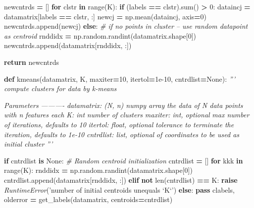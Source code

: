 \documentclass[]{book}
\newenvironment{Shaded}{\begin{snugshade}}{\end{snugshade}}
\newcommand{\BuiltInTok}[1]{#1}
\newcommand{\CommentTok}[1]{\textcolor[rgb]{0.56,0.35,0.01}{\textit{#1}}}
\newcommand{\ControlFlowTok}[1]{\textcolor[rgb]{0.13,0.29,0.53}{\textbf{#1}}}
\newcommand{\DecValTok}[1]{\textcolor[rgb]{0.00,0.00,0.81}{#1}}
\newcommand{\FloatTok}[1]{\textcolor[rgb]{0.00,0.00,0.81}{#1}}
\newcommand{\KeywordTok}[1]{\textcolor[rgb]{0.13,0.29,0.53}{\textbf{#1}}}
\newcommand{\NormalTok}[1]{#1}
\newcommand{\OperatorTok}[1]{\textcolor[rgb]{0.81,0.36,0.00}{\textbf{#1}}}
\newcommand{\PreprocessorTok}[1]{\textcolor[rgb]{0.56,0.35,0.01}{\textit{#1}}}
\newcommand{\StringTok}[1]{\textcolor[rgb]{0.31,0.60,0.02}{#1}}
\newcommand{\VariableTok}[1]{\textcolor[rgb]{0.00,0.00,0.00}{#1}}
\theoremstyle{definition}
\theoremstyle{definition}
\theoremstyle{definition}
\theoremstyle{definition}
\theoremstyle{remark}
\begin{document}
\begin{Shaded}
\begin{Highlighting}[]
\NormalTok{    newcntrds }\OperatorTok{=}\NormalTok{ []}
    \ControlFlowTok{for}\NormalTok{ clstr }\KeywordTok{in} \BuiltInTok{range}\NormalTok{(K):}
        \ControlFlowTok{if}\NormalTok{ (labels }\OperatorTok{==}\NormalTok{ clstr).}\BuiltInTok{sum}\NormalTok{() }\OperatorTok{>} \DecValTok{0}\NormalTok{:}
\NormalTok{            dataincj }\OperatorTok{=}\NormalTok{ datamatrix[labels }\OperatorTok{==}\NormalTok{ clstr, :]}
\NormalTok{            newcj }\OperatorTok{=}\NormalTok{ np.mean(dataincj, axis}\OperatorTok{=}\DecValTok{0}\NormalTok{)}
\NormalTok{            newcntrds.append(newcj)}
        \ControlFlowTok{else}\NormalTok{:}
            \CommentTok{# if no points in cluster -- use random datapoint as centroid}
\NormalTok{            rnddidx }\OperatorTok{=}\NormalTok{ np.random.randint(datamatrix.shape[}\DecValTok{0}\NormalTok{])}
\NormalTok{            newcntrds.append(datamatrix[rnddidx, :])}

    \ControlFlowTok{return}\NormalTok{ newcntrds}


\KeywordTok{def}\NormalTok{ kmeans(datamatrix, K, maxiter}\OperatorTok{=}\DecValTok{10}\NormalTok{, itertol}\OperatorTok{=}\FloatTok{1e-10}\NormalTok{, cntrdlist}\OperatorTok{=}\VariableTok{None}\NormalTok{):}
    \CommentTok{''' compute clusters for data by k-means}

\CommentTok{    Parameters}
\CommentTok{    ----------}
\CommentTok{    datamatrix: (N, n) numpy array}
\CommentTok{        the data of N data points with n features each}
\CommentTok{    K: int}
\CommentTok{        number of clusters}
\CommentTok{    maxiter: int, optional}
\CommentTok{        max number of iterations, defaults to 10}
\CommentTok{    itertol: float, optional}
\CommentTok{        tolerance to terminate the iteration, defaults to 1e-10}
\CommentTok{    cntrdlist: list, optional}
\CommentTok{        of coordinates to be used as initial cluster}
\CommentTok{    '''}

    \ControlFlowTok{if}\NormalTok{ cntrdlist }\KeywordTok{is} \VariableTok{None}\NormalTok{:}
        \CommentTok{# Random centroid initialization}
\NormalTok{        cntrdlist }\OperatorTok{=}\NormalTok{ []}
        \ControlFlowTok{for}\NormalTok{ kkk }\KeywordTok{in} \BuiltInTok{range}\NormalTok{(K):}
\NormalTok{            rnddidx }\OperatorTok{=}\NormalTok{ np.random.randint(datamatrix.shape[}\DecValTok{0}\NormalTok{])}
\NormalTok{            cntrdlist.append(datamatrix[rnddidx, :])}
    \ControlFlowTok{elif} \KeywordTok{not} \BuiltInTok{len}\NormalTok{(cntrdlist) }\OperatorTok{==}\NormalTok{ K:}
        \ControlFlowTok{raise} \PreprocessorTok{RuntimeError}\NormalTok{(}\StringTok{'number of initial centroids unequals `K`'}\NormalTok{)}
    \ControlFlowTok{else}\NormalTok{:}
        \ControlFlowTok{pass}
\NormalTok{    clabels, olderror }\OperatorTok{=}\NormalTok{ get_labels(datamatrix, centroids}\OperatorTok{=}\NormalTok{cntrdlist)}


\end{Highlighting}
\end{Shaded}
\end{document}
